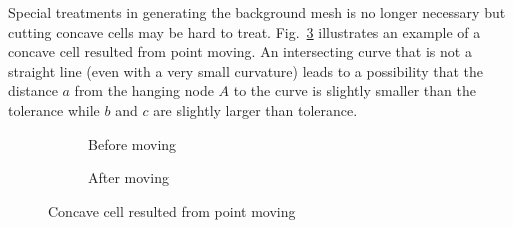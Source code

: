 Special treatments in generating the background mesh is no longer necessary but cutting concave cells may be hard to treat.
Fig.~\ref{qdt_fig:qdt_cutting_point_moving_2_concave} illustrates an example of a concave cell resulted from point moving.
An intersecting curve that is not a straight line (even with a very small curvature) leads to a possibility that the distance $a$ from the hanging node $A$ to the curve is slightly smaller than the tolerance while $b$ and $c$ are slightly larger than tolerance.
    \begin{figure}[h!]
        \begin{subfigure}[b]{0.5\linewidth}
            \centering
            \caption{Before moving}
            \label{qdt_fig:qdt_cutting_point_moving_2_concave_before}
        \end{subfigure}
        \begin{subfigure}[b]{0.5\linewidth}
            \centering
            \caption{After moving}
            \label{qdt_fig:qdt_cutting_point_moving_2_concave_after}
        \end{subfigure}
        \caption[Concave cell resulted from points moving]{Concave cell resulted from point moving}
        \label{qdt_fig:qdt_cutting_point_moving_2_concave}
    \end{figure}
